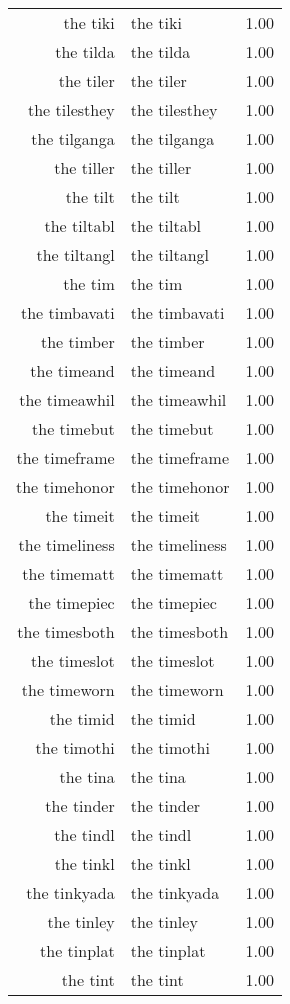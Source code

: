 \begin{table}[ht]
\begin{tabular}{rlr}
  the tiki & the tiki & 1.00 \\ 
  the tilda & the tilda & 1.00 \\ 
  the tiler & the tiler & 1.00 \\ 
  the tilesthey & the tilesthey & 1.00 \\ 
  the tilganga & the tilganga & 1.00 \\ 
  the tiller & the tiller & 1.00 \\ 
  the tilt & the tilt & 1.00 \\ 
  the tiltabl & the tiltabl & 1.00 \\ 
  the tiltangl & the tiltangl & 1.00 \\ 
  the tim & the tim & 1.00 \\ 
  the timbavati & the timbavati & 1.00 \\ 
  the timber & the timber & 1.00 \\ 
  the timeand & the timeand & 1.00 \\ 
  the timeawhil & the timeawhil & 1.00 \\ 
  the timebut & the timebut & 1.00 \\ 
  the timeframe & the timeframe & 1.00 \\ 
  the timehonor & the timehonor & 1.00 \\ 
  the timeit & the timeit & 1.00 \\ 
  the timeliness & the timeliness & 1.00 \\ 
  the timematt & the timematt & 1.00 \\ 
  the timepiec & the timepiec & 1.00 \\ 
  the timesboth & the timesboth & 1.00 \\ 
  the timeslot & the timeslot & 1.00 \\ 
  the timeworn & the timeworn & 1.00 \\ 
  the timid & the timid & 1.00 \\ 
  the timothi & the timothi & 1.00 \\ 
  the tina & the tina & 1.00 \\ 
  the tinder & the tinder & 1.00 \\ 
  the tindl & the tindl & 1.00 \\ 
  the tinkl & the tinkl & 1.00 \\ 
  the tinkyada & the tinkyada & 1.00 \\ 
  the tinley & the tinley & 1.00 \\ 
  the tinplat & the tinplat & 1.00 \\ 
  the tint & the tint & 1.00 \\ 

\end{tabular}
\end{table}
